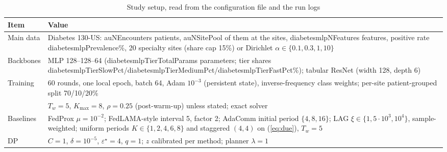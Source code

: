 \begin{table}[t]
\caption{Study setup, read from the configuration file and the run logs}
\label{tab:setup}
\centering\small
\begin{tabular}{@{}p{17mm}p{65mm}@{}}
\toprule
Item & Value\\
\midrule
Main data & Diabetes 130-US: \num{auNEncounters} patients, \num{auNSitePool} of them at the sites, \num{diabetesmlpNFeatures} features, positive rate \num{diabetesmlpPrevalence}\%, 20 specialty sites (share cap 15\%) or Dirichlet $\alpha\in\{0.1,0.3,1,10\}$\\
Backbones & MLP 128--128--64 (\num{diabetesmlpTierTotalParams} parameters; tier shares \num{diabetesmlpTierSlowPct}/\num{diabetesmlpTierMediumPct}/\num{diabetesmlpTierFastPct}\%); tabular ResNet (width 128, depth 6)\\
Training & 60 rounds, one local epoch, batch 64, Adam $10^{-3}$ (persistent state), inverse-frequency class weights; per-site patient-grouped split 70/10/20\%\\
\tierfed{} & $T_w=5$, $K_{\max}=8$, $\rho=0.25$ (post-warm-up) unless stated; exact solver\\
Baselines & FedProx $\mu=10^{-2}$; FedLAMA-style interval 5, factor 2; AdaComm initial period $\{4,8,16\}$; LAG $\xi\in\{1,5{\cdot}10^3,10^4\}$, sample-weighted; uniform periods $K\in\{1,2,4,6,8\}$ and staggered $(4,4)$ on (\ref{eq:due}), $T_w=5$\\
DP & $C=1$, $\delta=10^{-5}$, $\varepsilon^\star=4$, $q=1$; $z$ calibrated per method; planner $\lambda=1$\\
\bottomrule
\end{tabular}
\end{table}


